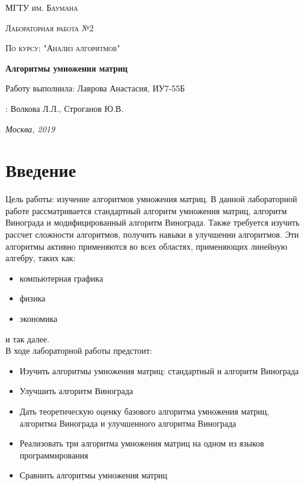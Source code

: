 \documentclass[12pt]{report}
\begin{document}
\begin{titlepage}
	\centering
	{\scshape\LARGE МГТУ им. Баумана \par}
	\vspace{3cm}
	{\scshape\Large Лабораторная работа №2\par}
	\vspace{0.5cm}	
	{\scshape\Large По курсу: "Анализ алгоритмов"\par}
	\vspace{1.5cm}
	{\huge\bfseries Алгоритмы умножения матриц\par}
	\vspace{2cm}
	\Large Работу выполнила: Лаврова Анастасия, ИУ7-55Б\par
	\vspace{0.5cm}
	:  Волкова Л.Л., Строганов Ю.В.\par

	\vfill
	\large \textit {Москва, 2019} \par
\end{titlepage}

\tableofcontents

\newpage
\chapter*{Введение}
Цель работы: изучение алгоритмов умножения матриц. В данной лабораторной работе рассматривается стандартный алгоритм умножения матриц, алгоритм Винограда и модифицированный алгоритм Винограда.  Также требуется изучить рассчет сложности алгоритмов, получить навыки в улучшении алгоритмов.
Эти алгоритмы активно применяются во всех областях, применяющих линейную алгебру, таких как:
\begin{itemize}
	\item компьютерная графика
	\item физика
	\item экономика
\end{itemize}
и так далее.\\

В ходе лабораторной работы предстоит:
\begin{itemize}
	\item Изучить алгоритмы умножения матриц: стандартный и алгоритм Винограда 
	\item Улучшить алгоритм Винограда 
	\item Дать теоретическую оценку базового алгоритма умножения матриц, алгоритма Винограда и улучшенного алгоритма Винограда 
	\item Реализовать три алгоритма умножения матриц на одном из языков программирования  
	\item Сравнить алгоритмы умножения матриц  
\end{itemize}
\end{document}
